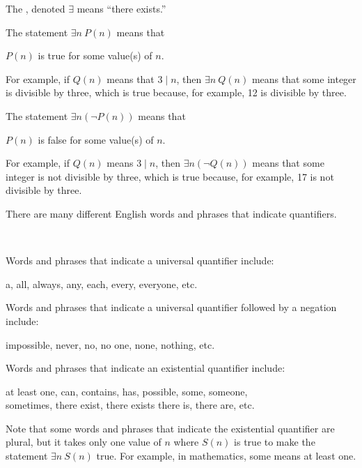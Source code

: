 \begin{defn}[Quantifiers]
\begin{apart}
        \item The , denoted $\exists$ means ``there exists.'' 
            \begin{bull}
                \item The statement $\exists n ~ P(n)$ means that
                    \begin{center}
                        $P(n)$ is true for some value(s) of $n$. 
                    \end{center} 
                For example, if $Q(n)$ means that $3 \mid n$, then $\exists n ~ Q(n)$ means that some integer is divisible by three, which is true because, for example, 12 is divisible by three.  
                \item The statement $\exists n (\neg P(n))$ means that
                    \begin{center}
                        $P(n)$ is false for some value(s) of $n$. 
                    \end{center} 
                For example, if $Q(n)$ means $3 \mid n$, then $\exists n (\neg Q(n))$ means that some integer is not divisible by three, which is true because, for example, 17 is not divisible by three.
            \end{bull}
    \end{apart}
\end{defn}

There are many different English words and phrases that indicate quantifiers.

\begin{rem}
~
    \begin{apart}
        \item Words and phrases that indicate a universal quantifier include: 
            \begin{center}
                a, all, always, any, each, every, everyone, etc.
            \end{center}
        \item Words and phrases that indicate a universal quantifier followed by a negation include: 
            \begin{center}
                impossible, never, no, no one, none, nothing, etc.
            \end{center}
        \item Words and phrases that indicate an existential quantifier include: 
            \begin{center}
                at least one, can, contains, has, possible, some, someone,\\ sometimes, there exist, there exists there is, there are, etc.
            \end{center}
        \item Note that some words and phrases that indicate the existential quantifier are plural, but it takes only one value of $n$ where $S(n)$ is true to make the statement $\exists n ~ S(n)$ true.  For example, in mathematics, some means at least one.
    \end{apart}
\end{rem}

